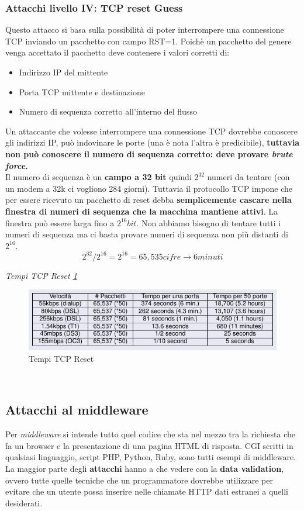 \documentclass[12pt]{article}
\begin{document}
			\subsubsection{Attacchi livello IV: TCP reset Guess}
				Questo attacco si basa sulla possibilità di poter interrompere una connessione TCP inviando un pacchetto con campo RST=1. Poichè un pacchetto del genere venga accettato il pacchetto deve contenere i valori corretti di:
				\begin{itemize}
					\item Indirizzo IP del mittente
					\item Porta TCP mittente e destinazione
					\item Numero di sequenza corretto all'interno del flusso
				\end{itemize}
				Un attaccante che volesse interrompere una connessione TCP dovrebbe conoscere gli indirizzi IP, può indovinare le porte (una è nota l'altra è predicibile), \textbf{tuttavia non può conoscere il numero di sequenza corretto: deve provare \textit{brute force}.}\\
				Il numero di sequenza è un \textbf{campo a 32 bit} quindi $2^{32}$ numeri da tentare (con un modem a 32k ci vogliono 284 giorni). Tuttavia il protocollo TCP impone che per essere ricevuto un pacchetto di reset debba \textbf{semplicemente cascare nella finestra di numeri di sequenza che la macchina mantiene attivi}. La finestra può essere larga fino a $2^{16} bit$. Non abbiamo bisogno di tentare tutti i numeri di sequenza ma ci basta provare numeri di sequenza non più distanti di $2^{16}$.
				$$2^{32}/2^{16} = 2^{16} = 65,535 cifre \rightarrow 6 minuti$$
				
				\textit{Tempi TCP Reset \ref{fig:29}}\\
				\begin{figure}[h!]
					\centering
					\includegraphics[scale=0.60]{img/tempi.PNG}
					\caption{Tempi TCP Reset \label{fig:29}}
				\end{figure}\\
				
		\subsection{Attacchi al middleware}
			Per \textit{middleware} si intende tutto quel codice che sta nel mezzo tra la richiesta che fa un browser e la presentazione di una pagina HTML di risposta. CGI scritti in qualsiasi linguaggio, script PHP, Python, Ruby, sono tutti esempi di middleware.\\
			La maggior parte degli \textbf{attacchi} hanno a che vedere con la \textbf{data validation}, ovvero tutte quelle tecniche che un programmatore dovrebbe utilizzare per evitare che un utente possa inserire nelle chiamate HTTP dati estranei a quelli desiderati. 
\end{document}
